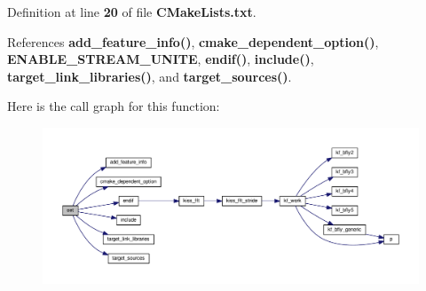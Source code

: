 Definition at line {\bf 20} of file {\bf C\+Make\+Lists.\+txt}.



References {\bf add\+\_\+feature\+\_\+info()}, {\bf cmake\+\_\+dependent\+\_\+option()}, {\bf E\+N\+A\+B\+L\+E\+\_\+\+S\+T\+R\+E\+A\+M\+\_\+\+U\+N\+I\+TE}, {\bf endif()}, {\bf include()}, {\bf target\+\_\+link\+\_\+libraries()}, and {\bf target\+\_\+sources()}.



Here is the call graph for this function\+:
\nopagebreak
\begin{figure}[H]
\begin{center}
\leavevmode
\includegraphics[width=350pt]{d1/d8c/limesuite-dev_2src_2ConnectionSTREAM__UNITE_2CMakeLists_8txt_a2726037e93ee5935bfee1b2378797688_cgraph}
\end{center}
\end{figure}


